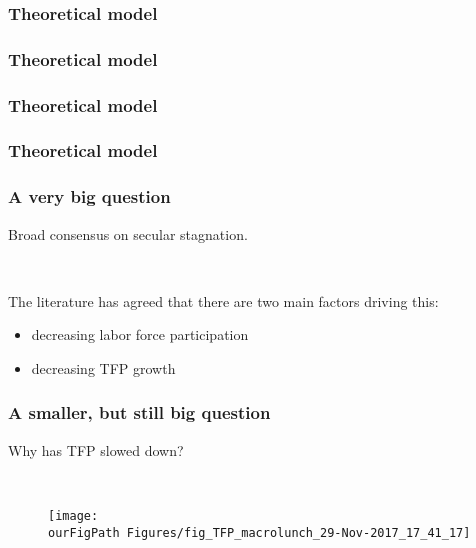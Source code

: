 \documentclass{beamer}
\def \ourFigPath {../../}
\begin{document}
\begin{frame}
	\frametitle{Theoretical model}

\end{frame}

\begin{frame}
	\frametitle{Theoretical model}

\end{frame}

\begin{frame}
	\frametitle{Theoretical model}

\end{frame}

\begin{frame}
	\frametitle{Theoretical model}

\end{frame}


\begin{frame}
	\frametitle{A very big question}
	
Broad consensus on secular stagnation.


\

The literature has agreed that there are two main factors driving this:
\begin{itemize}
\item decreasing labor force participation
\item decreasing TFP growth
\end{itemize}
	
	


\end{frame}

\begin{frame}
	\frametitle{A smaller, but still big question}
	

	Why has TFP slowed down? 
	
	
	\
	
	
	\vspace{-1cm}
	\noindent
	\begin{figure}
		\centering
		\texttt{[image: \\ourFigPath Figures/fig\_TFP\_macrolunch\_29-Nov-2017\_17\_41\_17]}
	\end{figure}
	
	
\end{frame}
\end{document}
